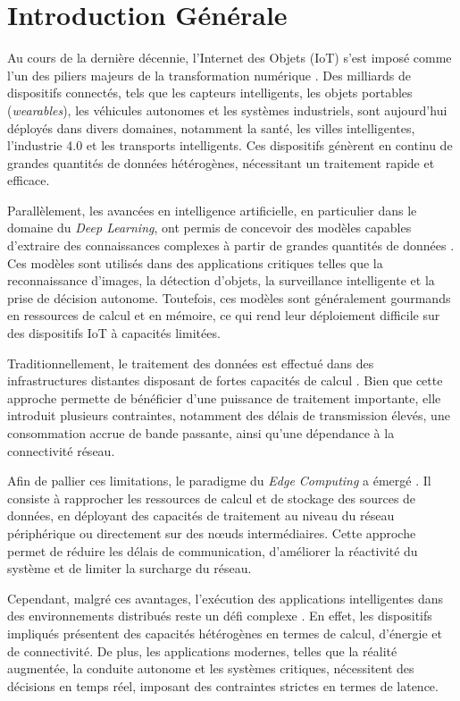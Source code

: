 \documentclass[12pt,a4paper]{report}
\begin{document}
\chapter*{Introduction Générale}

Au cours de la dernière décennie, l’Internet des Objets (IoT) s’est imposé comme l’un des piliers majeurs de la transformation numérique \cite{mecsurvey}. Des milliards de dispositifs connectés, tels que les capteurs intelligents, les objets portables (\textit{wearables}), les véhicules autonomes et les systèmes industriels, sont aujourd’hui déployés dans divers domaines, notamment la santé, les villes intelligentes, l’industrie 4.0 et les transports intelligents. Ces dispositifs génèrent en continu de grandes quantités de données hétérogènes, nécessitant un traitement rapide et efficace.

Parallèlement, les avancées en intelligence artificielle, en particulier dans le domaine du \textit{Deep Learning}, ont permis de concevoir des modèles capables d’extraire des connaissances complexes à partir de grandes quantités de données \cite{rlpdnn2021}. Ces modèles sont utilisés dans des applications critiques telles que la reconnaissance d’images, la détection d’objets, la surveillance intelligente et la prise de décision autonome. Toutefois, ces modèles sont généralement gourmands en ressources de calcul et en mémoire, ce qui rend leur déploiement difficile sur des dispositifs IoT à capacités limitées.

Traditionnellement, le traitement des données est effectué dans des infrastructures distantes disposant de fortes capacités de calcul \cite{mecsurvey}. Bien que cette approche permette de bénéficier d’une puissance de traitement importante, elle introduit plusieurs contraintes, notamment des délais de transmission élevés, une consommation accrue de bande passante, ainsi qu’une dépendance à la connectivité réseau.

Afin de pallier ces limitations, le paradigme du \textit{Edge Computing} a émergé \cite{baccour2024}. Il consiste à rapprocher les ressources de calcul et de stockage des sources de données, en déployant des capacités de traitement au niveau du réseau périphérique ou directement sur des nœuds intermédiaires. Cette approche permet de réduire les délais de communication, d’améliorer la réactivité du système et de limiter la surcharge du réseau.

Cependant, malgré ces avantages, l’exécution des applications intelligentes dans des environnements distribués reste un défi complexe \cite{mi2024}. En effet, les dispositifs impliqués présentent des capacités hétérogènes en termes de calcul, d’énergie et de connectivité. De plus, les applications modernes, telles que la réalité augmentée, la conduite autonome et les systèmes critiques, nécessitent des décisions en temps réel, imposant des contraintes strictes en termes de latence.
\end{document}

